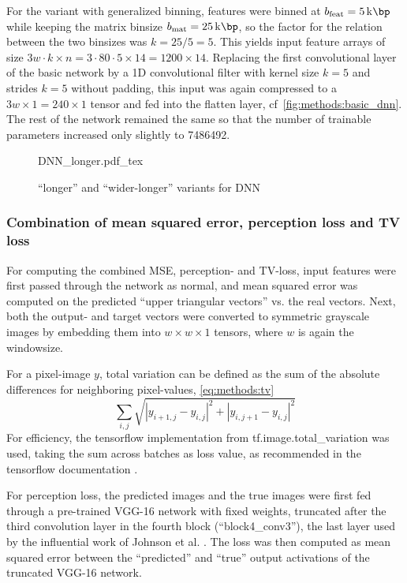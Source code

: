 For the variant with generalized binning, features were binned at $b_\textrm{feat} = \SI{5}{\kilo\bp}$ while keeping the matrix binsize $b_\textrm{mat} = \SI{25}{\kilo\bp}$,
so the factor for the relation between the two binsizes was $k=25/5=5$.
This yields input feature arrays of size $3w\cdot k \times n = 3\cdot80\cdot5 \times 14 = 1200\times 14$.
Replacing the first convolutional layer of the basic network by a 1D convolutional filter with kernel size $k=5$ and strides $k=5$ without padding,
this input was again compressed to a $3w\times 1 = 240\times 1$ tensor and fed into the flatten layer, cf~\cref{fig:methods:basic_dnn}. 
The rest of the network remained the same so that the number of trainable parameters increased only slightly to \SI{7486492}{}.
\begin{figure}[p]
    \small
    \centering
    {DNN_longer.pdf_tex}
    \caption{``longer'' and ``wider-longer'' variants for DNN}
    \label{fig:methods:longer_dnn}
\end{figure}

\subsubsection{Combination of mean squared error, perception loss and TV loss} \label{sec:methods:combined_loss}
For computing the combined MSE, perception- and TV-loss,
input features were first passed through the network as normal,
and mean squared error was computed on the predicted ``upper triangular vectors'' vs. the real vectors.
Next, both the output- and target vectors were converted to symmetric grayscale images by embedding them into 
$w \times w \times 1$ tensors, where $w$ is again the windowsize.

For a pixel-image $y$, total variation can be defined as the sum of the absolute differences for neighboring pixel-values, \cref{eq:methods:tv} \cite{Rudin1992}
\begin{equation}
 \sum_{i,j}\sqrt{|y_{i+1,j} - y_{i,j}|^2 + |y_{i,j+1} - y_{i,j} |^2 } \label{eq:methods:tv}
\end{equation}
For efficiency, the tensorflow implementation from tf.image.total\_variation was used,
taking the sum across batches as loss value, as recommended in the tensorflow documentation \cite{TensorflowTV2020}.

For perception loss, the predicted images and the true images were first fed through a pre-trained VGG-16 network with fixed weights, truncated after the third convolution layer
in the fourth block (``block4\_conv3''), the last layer used by the influential work of Johnson et al. \cite{Johnson2016}.
The loss was then computed as mean squared error between the ``predicted'' and ``true'' output activations of the truncated VGG-16 network.

